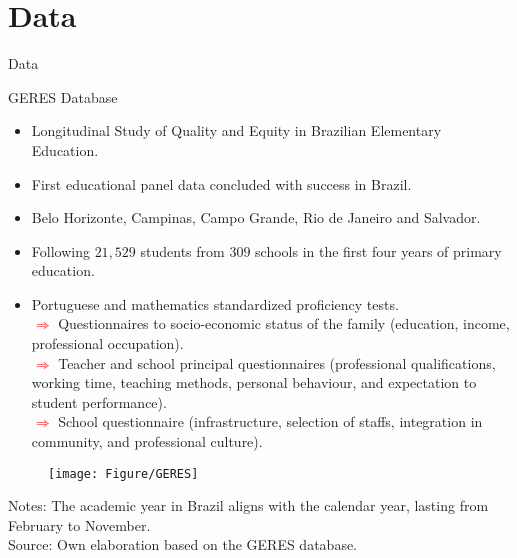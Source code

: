 \documentclass{beamer}
\begin{document}
\section{Data}


\begin{frame}[label=Main2]{Data}
\begin{block}{\centering \Large GERES Database}
\vspace{-18pt} \flushright \hyperlink{GERESSample}{\beamerbutton{\textcolor{red}{Sample}}}
\begin{itemize}
\item \scriptsize Longitudinal Study
of Quality and Equity in Brazilian Elementary Education.
\item \scriptsize First educational panel data concluded with success in Brazil.
\item \scriptsize Belo Horizonte, Campinas, Campo Grande, Rio de Janeiro and Salvador.
\item \scriptsize Following $21,529$ students from $309$ schools in the first four years of primary education.
\item \scriptsize Portuguese and mathematics standardized proficiency tests.
\\ \tiny\textcolor{red}{$\Longrightarrow$} Questionnaires to socio-economic status of the family (education, income, professional occupation).
\\ \tiny\textcolor{red}{$\Longrightarrow$} Teacher and school principal questionnaires (professional qualifications, working time, teaching methods, personal behaviour, and expectation to student performance).
\\ \tiny\textcolor{red}{$\Longrightarrow$} School questionnaire (infrastructure, selection of staffs, integration in community, and professional culture).
\end{itemize}
\end{block} 


\begin{figure}[htb]
\vspace{-0.5cm}
\centering
\texttt{[image: Figure/GERES]}
\end{figure}
     \vspace{-4.72cm}  \hspace{-1pt}
\begin{minipage}{1\textwidth} 
{{\fontsize{4}{4}\selectfont  
Notes: The academic year in Brazil aligns with the calendar year, lasting from February to November. \\
Source: Own elaboration based on the GERES database.\par}}
\end{minipage} 
\end{frame}
\end{document}
